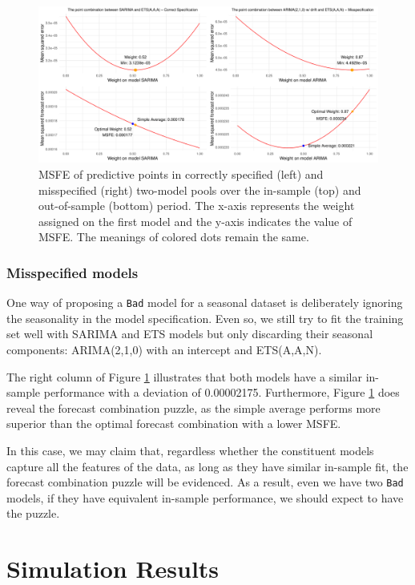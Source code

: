 \documentclass{monashthesis}
\begin{document}
\begin{figure}[ht]
\centering
\includegraphics[scale=0.5]{figures/EMPL.pdf}
\caption{MSFE of predictive points in correctly specified (left) and misspecified (right) two-model pools over the in-sample (top) and out-of-sample (bottom) period. The x-axis represents the weight assigned on the first model and the y-axis indicates the value of MSFE. The meanings of colored dots remain the same.}
\label{fig:sd}
\end{figure}

\hypertarget{misspecified-models}{%
\subsection{Misspecified models}\label{misspecified-models}}

One way of proposing a \texttt{Bad} model for a seasonal dataset is deliberately ignoring the seasonality in the model specification. Even so, we still try to fit the training set well with SARIMA and ETS models but only discarding their seasonal components: ARIMA(2,1,0) with an intercept and ETS(A,A,N).

The right column of Figure \ref{fig:sd} illustrates that both models have a similar in-sample performance with a deviation of 0.00002175. Furthermore, Figure \ref{fig:sd} does reveal the forecast combination puzzle, as the simple average performs more superior than the optimal forecast combination with a lower MSFE.

In this case, we may claim that, regardless whether the constituent models capture all the features of the data, as long as they have similar in-sample fit, the forecast combination puzzle will be evidenced. As a result, even we have two \texttt{Bad} models, if they have equivalent in-sample performance, we should expect to have the puzzle.

\hypertarget{simulation-results}{%
\chapter{Simulation Results}\label{simulation-results}}
\end{document}
